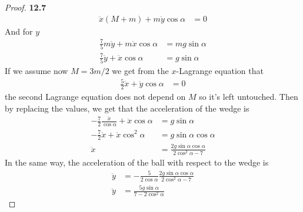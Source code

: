 \documentclass[11pt]{article}
\theoremstyle{definition}
\begin{document}
\begin{proof}{\textbf{12.7}}
\begin{align*}
        \ddot x (M + m) + m\ddot y\cos\alpha &= 0
    \end{align*}
    And for $y$
    \begin{align*}
        \frac{7}{5}m\ddot{y} + m\ddot x\cos\alpha &= mg\sin\alpha\\
        \frac{7}{5}\ddot{y} + \ddot x\cos\alpha &= g\sin\alpha
    \end{align*}
    If we assume now $M = 3m/2$ we get from the $x$-Lagrange equation that
    \begin{align*}
        \frac{5}{2}\ddot x + \ddot y\cos\alpha &= 0
    \end{align*}
    the second Lagrange equation does not depend on $M$ so it's left untouched. 
    Then by replacing the values, we get that the acceleration of the wedge is
    \begin{align*}
        -\frac{7}{2}\frac{\ddot x}{\cos\alpha} + \ddot x\cos\alpha &= g\sin\alpha\\
        -\frac{7}{2}\ddot x + \ddot x\cos^2\alpha &= g\sin\alpha\cos\alpha\\
        \ddot x &= \frac{2g\sin\alpha\cos\alpha}{2\cos^2\alpha - 7}
    \end{align*}
    In the same way, the acceleration of the ball with respect to the wedge is
    \begin{align*}
        \ddot y &=
        -\frac{5}{2\cos\alpha}\frac{2g\sin\alpha\cos\alpha}{2\cos^2\alpha - 7}\\
        \ddot y &= \frac{5g\sin\alpha}{7-2\cos^2\alpha}
    \end{align*}
\end{proof} 
\cleardoublepage
\end{document}
